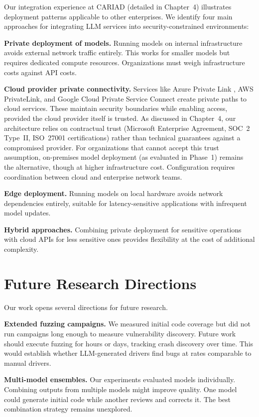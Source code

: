 Our integration experience at CARIAD (detailed in Chapter~4) illustrates deployment patterns applicable to other enterprises. We identify four main approaches for integrating LLM services into security-constrained environments:

\textbf{Private deployment of models.} Running models on internal infrastructure avoids external network traffic entirely. This works for smaller models but requires dedicated compute resources. Organizations must weigh infrastructure costs against API costs.

\textbf{Cloud provider private connectivity.} Services like Azure Private Link \cite{azure_private_link}, AWS PrivateLink, and Google Cloud Private Service Connect create private paths to cloud services. These maintain security boundaries while enabling access, provided the cloud provider itself is trusted. As discussed in Chapter~4, our architecture relies on contractual trust (Microsoft Enterprise Agreement, SOC~2 Type~II, ISO~27001 certifications) rather than technical guarantees against a compromised provider. For organizations that cannot accept this trust assumption, on-premises model deployment (as evaluated in Phase~1) remains the alternative, though at higher infrastructure cost. Configuration requires coordination between cloud and enterprise network teams.

\textbf{Edge deployment.} Running models on local hardware avoids network dependencies entirely, suitable for latency-sensitive applications with infrequent model updates.

\textbf{Hybrid approaches.} Combining private deployment for sensitive operations with cloud APIs for less sensitive ones provides flexibility at the cost of additional complexity.


\section{Future Research Directions}
\label{sec:discussion_future}

Our work opens several directions for future research.

\textbf{Extended fuzzing campaigns.} We measured initial code coverage but did not run campaigns long enough to measure vulnerability discovery. Future work should execute fuzzing for hours or days, tracking crash discovery over time. This would establish whether LLM-generated drivers find bugs at rates comparable to manual drivers.

\textbf{Multi-model ensembles.} Our experiments evaluated models individually. Combining outputs from multiple models might improve quality. One model could generate initial code while another reviews and corrects it. The best combination strategy remains unexplored.

